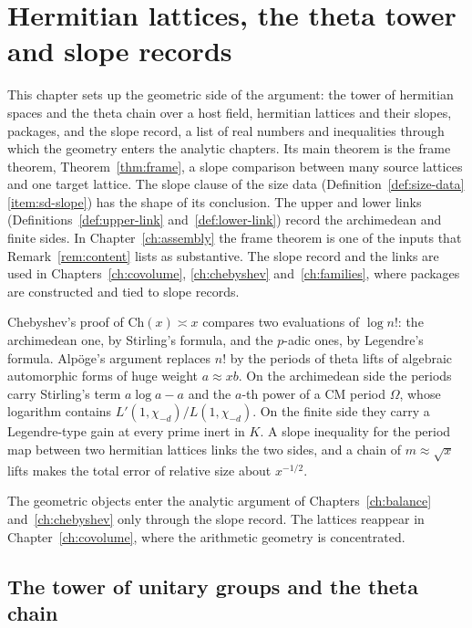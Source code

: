 \documentclass[11pt]{amsbook}
\theoremstyle{plain}
\theoremstyle{definition}
\theoremstyle{remark}
\numberwithin{equation}{section}
\numberwithin{figure}{chapter}
\numberwithin{table}{chapter}
\newcommand{\Ch}{\mathrm{Ch}}
\begin{document}
\FloatBarrier
\clearpage
\clearpage
\chapter{Hermitian lattices, the theta tower and slope records}
\label{ch:theta}\label{sec:slopes}

This chapter sets up the geometric side of the argument: the tower of
hermitian spaces and the theta chain over a host field, hermitian
lattices and their slopes, packages, and the slope record, a list of
real numbers and inequalities through which the geometry enters the
analytic chapters. Its main theorem is the frame theorem,
Theorem~\ref{thm:frame}, a slope comparison between many source
lattices and one target lattice. The slope clause of the size data
(Definition~\ref{def:size-data}\ref{item:sd-slope}) has the shape of
its conclusion. The upper and lower links
(Definitions~\ref{def:upper-link} and~\ref{def:lower-link}) record
the archimedean and finite sides. In Chapter~\ref{ch:assembly} the
frame theorem is one of the inputs that Remark~\ref{rem:content}
lists as substantive. The slope record and the links are used in
Chapters~\ref{ch:covolume}, \ref{ch:chebyshev}
and~\ref{ch:families}, where packages are constructed and tied to
slope records.

Chebyshev's proof of $\Ch(x)\asymp x$ compares two evaluations of
$\log n!$: the archimedean one, by Stirling's formula, and the $p$-adic
ones, by Legendre's formula. Alpöge's argument replaces $n!$ by the
periods of theta lifts of algebraic automorphic forms of huge weight
$a\approx xb$. On the archimedean side the periods carry Stirling's term
$a\log a-a$ and the $a$-th power of a CM period $\Omega$, whose logarithm
contains $L'(1,\chi_{-d})/L(1,\chi_{-d})$. On the finite side they carry
a Legendre-type gain at every prime inert in $K$. A slope inequality for
the period map between two hermitian lattices links the two sides, and a
chain of $m\approx\sqrt x$ lifts makes the total error of relative size
about $x^{-1/2}$.

The geometric objects enter the analytic argument of
Chapters~\ref{ch:balance} and~\ref{ch:chebyshev} only through the
slope record. The lattices reappear in Chapter~\ref{ch:covolume},
where the arithmetic geometry is concentrated.

\section{The tower of unitary groups and the theta chain}
\end{document}
